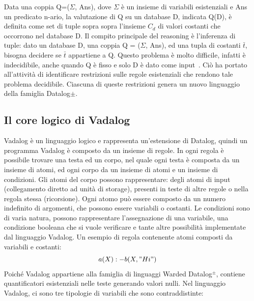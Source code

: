Data una coppia Q=($\Sigma$, Ans), dove $\Sigma$ è un insieme di variabili esistenziali e Ans un predicato n-ario, la valutazione di Q su un database D, indicata Q(D), è definita come set di tuple sopra sopra l'insieme $C_{d}$ di valori costanti che occorrono nel database D. \newline
Il compito principale del reasoning è l'inferenza di tuple: dato un database D, una coppia Q = ($\Sigma$, Ans), ed una tupla di costanti $\bar{t}$, bisogna decidere se $\bar{t}$ appartiene a Q. Questo problema è molto difficile, infatti è indecidibile, anche quando Q è fisso e solo D è dato come input~\cite{cali2013taming}. \newline
Ciò ha portato all'attività di identificare restrizioni sulle regole esistenziali che rendono tale problema decidibile. Ciascuna di queste restrizioni genera un nuovo linguaggio della famiglia Datalog$\pm$. \newline

\subsection{Il core logico di Vadalog}

Vadalog è un linguaggio logico e rappresenta un'estensione di Datalog, quindi un programma Vadalog è composto da un insieme di regole. \newline
In ogni regola è possibile trovare una testa ed un corpo, nel quale ogni testa è composta da un insieme di atomi, ed ogni corpo da un insieme di atomi e un insieme di condizioni. Gli atomi del corpo possono rappresentare: degli atomi di input (collegamento diretto ad unità di storage), presenti in teste di altre regole o nella regola stessa (ricorsione). \newline 
Ogni atomo può essere composto da un numero indefinito di argomenti, che possono essere variabili o costanti. \newline
Le condizioni sono di varia natura, possono rappresentare l'assegnazione di una variabile, una condizione booleana che si vuole verificare e tante altre possibilità implementate dal linguaggio Vadalog. \newline
Un esempio di regola contenente atomi composti da variabili e costanti: \[a(X) :- b(X,"Hi")\]
Poiché Vadalog appartiene alla famiglia di linguaggi Warded Datalog$^\pm$, contiene quantificatori esistenziali nelle teste generando valori nulli. \newline
Nel linguaggio Vadalog, ci sono tre tipologie di variabili che sono contraddistinte:

